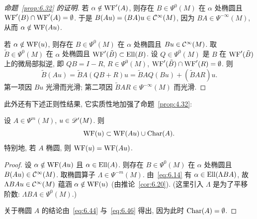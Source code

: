 \begin{proof}[命题~\ref{prop:6.32} 的证明]
若 $\alpha \notin \operatorname{WF}'(A)$, 则存在 $B \in \Psi^0(M)$ 在 $\alpha$ 处椭圆且 $\operatorname{WF}'(B) \cap \operatorname{WF}'(A) = \emptyset$. 于是 $B(A u) = (B A) u \in \mathcal{C}^\infty(M)$, 因为 $B A \in \Psi^{-\infty}(M)$, 从而 $\alpha \notin \operatorname{WF}(A u)$.

若 $\alpha \notin \operatorname{WF}(u)$, 则存在 $B \in \Psi^0(M)$ 在 $\alpha$ 处椭圆且 $B u \in \mathcal{C}^\infty(M)$. 取 $\tilde{B} \in \Psi^0(M)$ 在 $\alpha$ 处椭圆且 $\operatorname{WF}'(\tilde{B}) \subset \operatorname{Ell}(B)$. 设 $Q \in \Psi^0(M)$ 是 $B$ 在 $\operatorname{WF}'(\tilde{B})$ 上的微局部拟逆, 即 $Q B = I - R$, $R \in \Psi^0(M)$, $\operatorname{WF}'(\tilde{B}) \cap \operatorname{WF}'(R) = \emptyset$. 则
\begin{equation}\label{eq:6.45}
    \tilde{B}(A u) = \tilde{B} A (Q B + R) u = \tilde{B} A Q (B u) + (\tilde{B} A R) u.
\end{equation}
第一项因 $B u$ 光滑而光滑; 第二项因 $\tilde{B} A R \in \Psi^{-\infty}(M)$ 而光滑.
\end{proof}

此外还有下述正则性结果, 它实质性地加强了命题~\ref{prop:4.32}:

\begin{proposition}[微局部椭圆正则性]\label{prop:6.33}
设 $A \in \Psi^m(M)$, $u \in \mathscr{D}'(M)$. 则
\begin{equation}\label{eq:6.46}
    \operatorname{WF}(u) \subset \operatorname{WF}(A u) \cup \operatorname{Char}(A).
\end{equation}
特别地, 若 $A$ 椭圆, 则 $\operatorname{WF}(u) = \operatorname{WF}(A u)$.
\end{proposition}

\begin{proof}
设 $\alpha \notin \operatorname{WF}(A u)$ 且 $\alpha \in \operatorname{Ell}(A)$. 则存在 $B \in \Psi^0(M)$ 在 $\alpha$ 处椭圆且 $B(A u) \in \mathcal{C}^\infty(M)$. 取椭圆算子 $\Lambda \in \Psi^{-m}(M)$. 由~\eqref{eq:6.14} 有 $\alpha \in \operatorname{Ell}(\Lambda B A)$, 故 $\Lambda B A u \in \mathcal{C}^\infty(M)$ 蕴涵 $\alpha \notin \operatorname{WF}(u)$ (由推论~\ref{cor:6.20}). (这里引入 $\Lambda$ 是为了平移阶数: $\Lambda B A \in \Psi^0(M)$.)

关于椭圆 $A$ 的结论由~\eqref{eq:6.44} 与~\eqref{eq:6.46} 得出, 因为此时 $\operatorname{Char}(A) = \emptyset$.
\end{proof}

